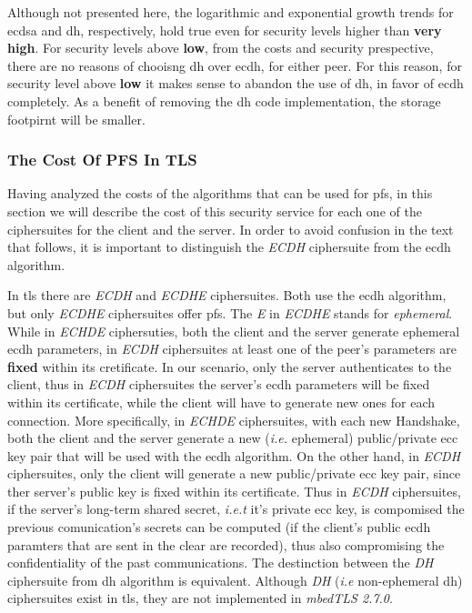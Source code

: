 \documentclass{llncs}
\begin{document}
Although not presented here, the logarithmic and exponential growth trends for \gls{ecdsa} and \gls{dh}, respectively, hold true even for
security levels higher than \textbf{very high}. For security levels above \textbf{low}, from the costs and security prespective, there are no
reasons of chooisng \gls{dh} over \gls{ecdh}, for either peer. For this reason, for security level above \textbf{low} it makes sense to abandon the 
use of \gls{dh}, in favor of \gls{ecdh} completely. As a benefit of removing the \gls{dh} code implementation, the storage footpirnt will be smaller.


\subsubsection{The Cost Of PFS In TLS}

Having analyzed the costs of the algorithms that can be used for \gls{pfs}, in this section we will describe the cost of this security service
for each one of the ciphersuites for the client and the server. In order to avoid confusion in the text that follows, it is important to 
distinguish the \textit{ECDH} ciphersuite from the \gls{ecdh} algorithm. 

In \gls{tls} there are \textit{ECDH} and \textit{ECDHE} ciphersuites. Both use the \gls{ecdh} algorithm, but only \textit{ECDHE} ciphersuites 
offer \gls{pfs}. The \textit{E} in \textit{ECDHE} stands for \textit{ephemeral}. While in \textit{ECHDE} ciphersuties, both the client and the server 
generate ephemeral \gls{ecdh} parameters, in \textit{ECDH} ciphersuites at least one of the peer's parameters are \textbf{fixed} 
within its cretificate. In our scenario, only the server authenticates to the client, thus in \textit{ECDH} ciphersuites the server's 
\gls{ecdh} parameters will be fixed within its certificate, while the client will have to generate new ones for each connection. 
More specifically, in \textit{ECHDE} ciphersuites, with each  new Handshake, both the client and the server generate a new (\textit{i.e.} ephemeral) 
public/private \gls{ecc} key pair that will be used with the \gls{ecdh} algorithm. On the other hand, in \textit{ECDH} ciphersuites, only the client 
will generate a new public/private \gls{ecc} key pair, since ther server's public key is fixed within its certificate. Thus in \textit{ECDH} 
ciphersuites, if the server's long-term shared secret, \textit{i.e.t} it's private \gls{ecc} key, is compomised the previous comunication's secrets 
can be computed (if the client's public \gls{ecdh} paramters that are sent in the clear are recorded), thus also compromising the confidentiality of 
the past communications. The destinction between the \textit{DH} ciphersuite from \gls{dh} algorithm is equivalent. Although \textit{DH} (\textit{i.e}
non-ephemeral \gls{dh}) ciphersuites exist in \gls{tls}, they are not implemented in \textit{mbedTLS 2.7.0}.
\end{document}
